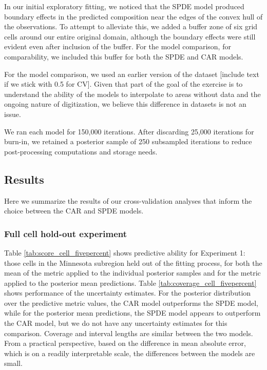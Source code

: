 \documentclass[12pt]{article}\usepackage[]{graphicx}\usepackage[]{color}
\begin{document}
In our initial exploratory fitting, we noticed that the SPDE model
produced boundary effects in the predicted composition near the edges
of the convex hull of the observations. To attempt to alleviate this,
we added a buffer zone of six grid cells around our entire original
domain, although the boundary effects were still evident even after
inclusion of the buffer. For the model comparison, for comparability,
we included this buffer for both the SPDE and CAR models. 

For the model comparison, we used an earlier version of the dataset
{[}include text if we stick with 0.5 for CV{]}. Given that part of
the goal of the exercise is to understand the ability of the models
to interpolate to areas without data and the ongoing nature of digitization,
we believe this difference in datasets is not an issue.

We ran each model for 150,000 iterations. After discarding 25,000
iterations for burn-in, we retained a posterior sample of 250 subsampled
iterations to reduce post-processing computations and storage needs. 





\subsection{Results}

Here we summarize the results of our cross-validation analyses that
inform the choice between the CAR and SPDE models. 


\subsubsection{Full cell hold-out experiment}

Table \ref{tab:score_cell_fivepercent} shows predictive ability for
Experiment 1: those cells in the Minnesota subregion held out of the
fitting process, for both the mean of the metric applied to the individual
posterior samples and for the metric applied to the posterior mean
predictions. Table \ref{tab:coverage_cell_fivepercent} shows performance
of the uncertainty estimates. For the posterior distribution over
the predictive metric values, the CAR model outperforms the SPDE model,
while for the posterior mean predictions, the SPDE model appears to
outperform the CAR model, but we do not have any uncertainty estimates
for this comparison. Coverage and interval lengths are similar between
the two models. From a practical perspective, based on the difference
in mean absolute error, which is on a readily interpretable scale,
the differences between the models are small. 
\end{document}
